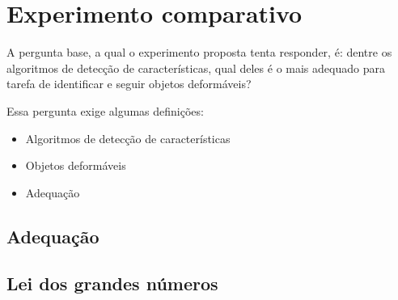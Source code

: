 \chapter{Experimento comparativo}

A pergunta base, a qual o experimento proposta tenta responder, é: dentre os algoritmos de
detecção de características, qual deles é o mais adequado para tarefa de
identificar e seguir objetos deformáveis?

Essa pergunta exige algumas definições:

\begin{itemize}
  \item Algoritmos de detecção de características
  \item Objetos deformáveis
  \item Adequação
\end{itemize}

\section{Adequação}

\section{Lei dos grandes números}
